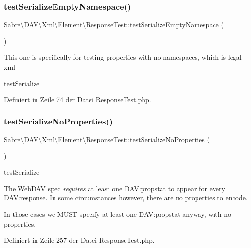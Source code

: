 \subsubsection{\texorpdfstring{test\+Serialize\+Empty\+Namespace()}{testSerializeEmptyNamespace()}}
{\footnotesize\ttfamily Sabre\textbackslash{}\+D\+A\+V\textbackslash{}\+Xml\textbackslash{}\+Element\textbackslash{}\+Response\+Test\+::test\+Serialize\+Empty\+Namespace (\begin{DoxyParamCaption}{ }\end{DoxyParamCaption})}

This one is specifically for testing properties with no namespaces, which is legal xml

test\+Serialize 

Definiert in Zeile 74 der Datei Response\+Test.\+php.

\mbox{\label{class_sabre_1_1_d_a_v_1_1_xml_1_1_element_1_1_response_test_a2257f4dfc9bdd087b6f871cbb85276ec}} 
\subsubsection{\texorpdfstring{test\+Serialize\+No\+Properties()}{testSerializeNoProperties()}}
{\footnotesize\ttfamily Sabre\textbackslash{}\+D\+A\+V\textbackslash{}\+Xml\textbackslash{}\+Element\textbackslash{}\+Response\+Test\+::test\+Serialize\+No\+Properties (\begin{DoxyParamCaption}{ }\end{DoxyParamCaption})}

test\+Serialize

The Web\+D\+AV spec {\itshape requires} at least one D\+AV\+:propstat to appear for every D\+AV\+:response. In some circumstances however, there are no properties to encode.

In those cases we M\+U\+ST specify at least one D\+AV\+:propstat anyway, with no properties. 

Definiert in Zeile 257 der Datei Response\+Test.\+php.

\mbox{\label{class_sabre_1_1_d_a_v_1_1_xml_1_1_element_1_1_response_test_a9d1f81068021b06d1eb8b516db47895b}} 

